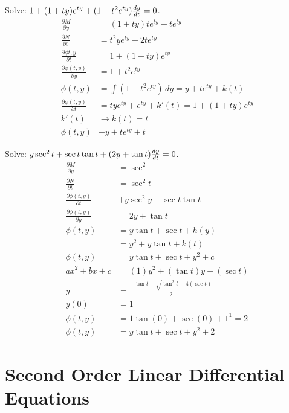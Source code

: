 \documentclass[12pt]{article}
\begin{document}
\begin{example} Solve: $1 + (1 + ty)e^{ty} + (1 + t^2e^{ty})\frac{dy}{dt} = 0$. $$\begin{aligned} \frac{\partial M}{\partial y} &= (1 + ty)te^{ty} + te^{ty} \\ \frac{\partial N}{\partial t} &= t^2ye^{ty} + 2te^{ty} \\ \frac{\partial \phi{t, y}}{\partial t} &= 1 + (1 + ty)e^{ty} \\ \frac{\partial \phi(t, y)}{\partial y} &= 1 + t^2e^{ty} \\ \phi(t, y) &= \int (1 + t^2e^{ty}) \, dy = y + te^{ty} + k(t) \\ \frac{\partial \phi(t, y)}{\partial t} &= tye^{ty} + e^{ty} + k'(t) = 1 + (1 + ty)e^{ty} \\ k'(t) &\to k(t) = t \\ \phi(t, y) &+ y + te^{ty} + t \end{aligned} $$ \end{example} 
\begin{example} Solve: $y\sec^2 t + \sec t\tan t + (2y + \tan t)\frac{dy}{dt} = 0$. $$\begin{aligned} \frac{\partial M}{\partial y} &= \sec^2 \\ \frac{\partial N}{\partial t} &= \sec^2 t \\ \frac{\partial \phi(t, y)}{\partial t} &+ y\sec^2 y + \sec t \tan t \\ \frac{\partial \phi(t, y)}{\partial y} &= 2y + \tan t \\ \phi(t, y) &= y\tan t + \sec t + h(y) \\ &= y^2 + y\tan t + k(t) \\ \phi(t, y) &= y\tan t + \sec t + y^2 + c \\ ax^2 + bx + c &= (1)y^2 + (\tan t)y + (\sec t) \\ y &= \frac{-\tan t \pm \sqrt{\tan^2 t - 4(\sec t)}}{2} \\ y(0) &= 1 \\ \phi(t, y) &= 1\tan(0) + \sec(0) + 1^1 = 2 \\ \phi(t, y) &= y\tan t + \sec t + y^2 + 2 \end{aligned} $$ \end{example} 

\section{Second Order Linear Differential Equations} 
\end{document}
